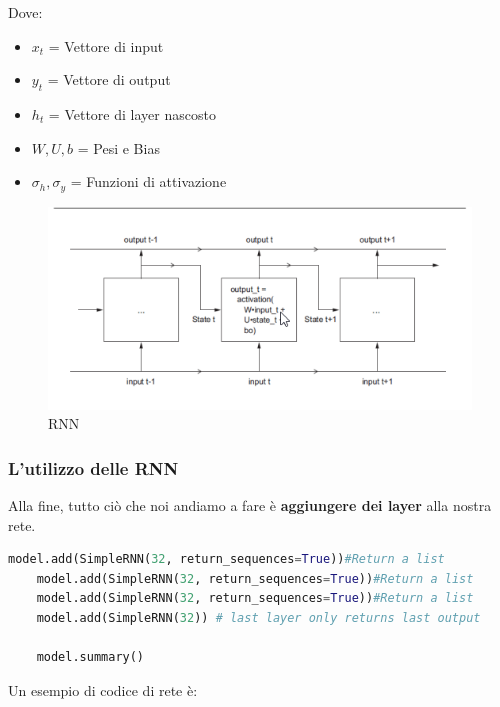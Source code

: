 Dove:
\begin{itemize}
    \item $x_t$ = Vettore di input
    \item $y_t$ = Vettore di output
    \item $h_t$ = Vettore di layer nascosto
    \item $W,U,b$ = Pesi e Bias
    \item $\sigma_h, \sigma_y$ = Funzioni di attivazione
\end{itemize}

\begin{figure}
    \begin{center}
        \includegraphics[scale=0.8]{images/RNN.png}
    \end{center}
    \caption{RNN}
\end{figure}

\subsubsection{L'utilizzo delle RNN}

Alla fine, tutto ciò che noi andiamo a fare è \textbf{aggiungere dei layer}
alla nostra rete.

\begin{lstlisting}[language=python]
    model.add(SimpleRNN(32, return_sequences=True))#Return a list
    model.add(SimpleRNN(32, return_sequences=True))#Return a list
    model.add(SimpleRNN(32, return_sequences=True))#Return a list
    model.add(SimpleRNN(32)) # last layer only returns last output

    model.summary()
\end{lstlisting}

Un esempio di codice di rete è:

